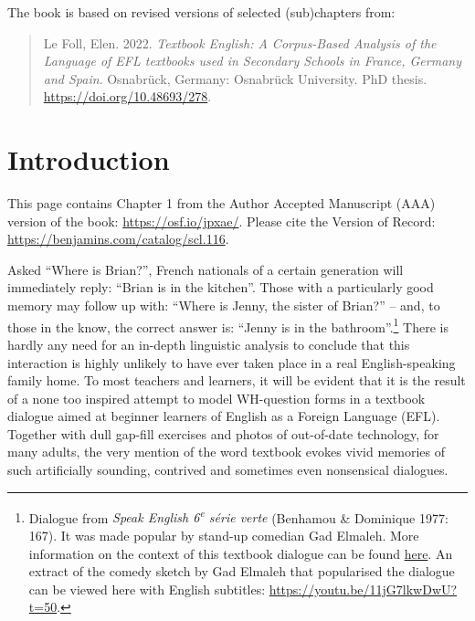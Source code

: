 \documentclass[
  letterpaper,
  DIV=11,
  numbers=noendperiod]{scrreprt}
\begin{document}
The book is based on revised versions of selected (sub)chapters from:

\begin{quote}
Le Foll, Elen. 2022. \emph{Textbook English: A Corpus-Based Analysis of
the Language of EFL textbooks used in Secondary Schools in France,
Germany and Spain}. Osnabrück, Germany: Osnabrück University. PhD
thesis. \url{https://doi.org/10.48693/278}.
\end{quote}


\chapter{Introduction}\label{introduction}

\begin{tcolorbox}[enhanced jigsaw, toprule=.15mm, coltitle=black, rightrule=.15mm, colframe=quarto-callout-note-color-frame, titlerule=0mm, bottomrule=.15mm, colbacktitle=quarto-callout-note-color!10!white, colback=white, arc=.35mm, opacitybacktitle=0.6, toptitle=1mm, bottomtitle=1mm, leftrule=.75mm, left=2mm, title=\textcolor{quarto-callout-note-color}{\faInfo}\hspace{0.5em}{Note}, opacityback=0, breakable]

This page contains Chapter 1 from the Author Accepted Manuscript (AAA)
version of the book: \url{https://osf.io/jpxae/}. Please cite the
Version of Record: \url{https://benjamins.com/catalog/scl.116}.

\end{tcolorbox}

Asked ``Where is Brian?'', French nationals of a certain generation will
immediately reply: ``Brian is in the kitchen''. Those with a
particularly good memory may follow up with: ``Where is Jenny, the
sister of Brian?'' -- and, to those in the know, the correct answer is:
``Jenny is in the bathroom''.\footnote{Dialogue from \emph{Speak English
  6\textsuperscript{e} série verte} (Benhamou \& Dominique 1977: 167).
  It was made popular by stand-up comedian Gad Elmaleh. More information
  on the context of this textbook dialogue can be found
  \href{https://fr.wikipedia.org/wiki/Where_is_Brian\%3F}{here}. An
  extract of the comedy sketch by Gad Elmaleh that popularised the
  dialogue can be viewed here with English subtitles:
  \url{https://youtu.be/11jG7lkwDwU?t=50}.} There is hardly any need for
an in-depth linguistic analysis to conclude that this interaction is
highly unlikely to have ever taken place in a real English-speaking
family home. To most teachers and learners, it will be evident that it
is the result of a none too inspired attempt to model WH-question forms
in a textbook dialogue aimed at beginner learners of English as a
Foreign Language (EFL). Together with dull gap-fill exercises and photos
of out-of-date technology, for many adults, the very mention of the word
textbook evokes vivid memories of such artificially sounding, contrived
and sometimes even nonsensical dialogues.
\end{document}
